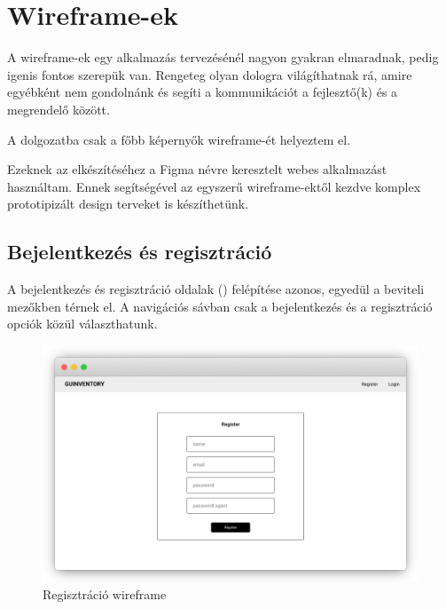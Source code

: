 \chapter{Wireframe-ek}

A wireframe-ek egy alkalmazás tervezésénél nagyon gyakran elmaradnak, pedig igenis fontos szerepük van.
Rengeteg olyan dologra világíthatnak rá, amire egyébként nem gondolnánk és segíti a kommunikációt a fejlesztő(k) és a megrendelő között.

A dolgozatba csak a főbb képernyők wireframe-ét helyeztem el.

Ezeknek az elkészítéséhez a Figma névre keresztelt webes alkalmazást használtam. 
Ennek segítségével az egyszerű wireframe-ektől kezdve komplex prototipizált design terveket is készíthetünk.

\section{Bejelentkezés és regisztráció}
A bejelentkezés és regisztráció oldalak () felépítése azonos, egyedül a beviteli mezőkben térnek el.
A navigációs sávban csak a bejelentkezés és a regisztráció opciók közül választhatunk.
\begin{figure}[!ht]
  \centering
  \includegraphics[width=150mm, keepaspectratio]{figures/wireframes/frame_registration.png}
  \caption{Regisztráció wireframe}
  \label{fig:RegistrationWireframe}
\end{figure}


